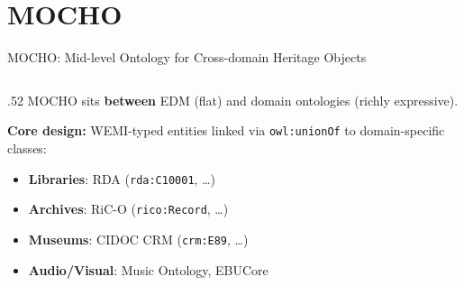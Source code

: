 \documentclass[xcolor,aspectratio=169,compress]{beamer}
\begin{document}
\section{MOCHO}

\begin{frame}{MOCHO: Mid-level Ontology for Cross-domain Heritage Objects}
  \small
  \begin{columns}
    \begin{column}{.52\textwidth}
      MOCHO sits \textbf{between} EDM (flat) and domain ontologies (richly expressive).
      \medskip

      \textbf{Core design:} WEMI-typed entities linked via \texttt{owl:unionOf}
      to domain-specific classes:
      \smallskip
      \begin{itemize}\setlength{\itemsep}{2pt}
        \item \textbf{Libraries}: RDA (\texttt{rda:C10001}, \ldots)
        \item \textbf{Archives}: RiC-O (\texttt{rico:Record}, \ldots)
        \item \textbf{Museums}: CIDOC CRM (\texttt{crm:E89}, \ldots)
        \item \textbf{Audio/Visual}: Music Ontology, EBUCore
      \end{itemize}
      \medskip


\end{column}
\end{columns}
\end{frame}
\end{document}
